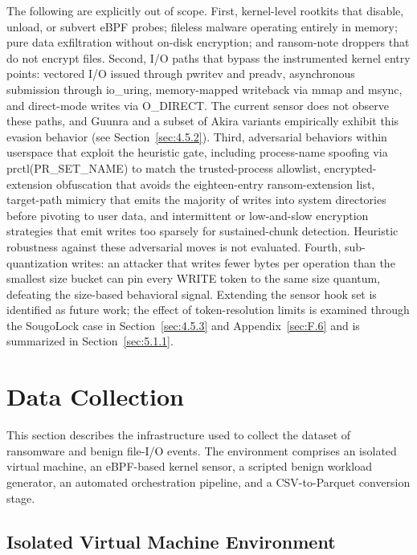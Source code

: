The following are explicitly out of scope. First, kernel-level rootkits that disable, unload, or subvert eBPF probes; fileless malware operating entirely in memory; pure data exfiltration without on-disk encryption; and ransom-note droppers that do not encrypt files. Second, I/\allowbreak{}O paths that bypass the instrumented kernel entry points: vectored I/\allowbreak{}O issued through pwritev and preadv, asynchronous submission through io\_\allowbreak{}uring, memory-mapped writeback via mmap and msync, and direct-mode writes via O\_\allowbreak{}DIRECT. The current sensor does not observe these paths, and Guunra and a subset of Akira variants empirically exhibit this evasion behavior (see Section~\ref{sec:4.5.2}). Third, adversarial behaviors within userspace that exploit the heuristic gate, including process-name spoofing via prctl(PR\_\allowbreak{}SET\_\allowbreak{}NAME) to match the trusted-process allowlist, encrypted-extension obfuscation that avoids the eighteen-entry ransom-extension list, target-path mimicry that emits the majority of writes into system directories before pivoting to user data, and intermittent or low-and-slow encryption strategies that emit writes too sparsely for sustained-chunk detection. Heuristic robustness against these adversarial moves is not evaluated. Fourth, sub-quantization writes: an attacker that writes fewer bytes per operation than the smallest size bucket can pin every WRITE token to the same size quantum, defeating the size-based behavioral signal. Extending the sensor hook set is identified as future work; the effect of token-resolution limits is examined through the SougoLock case in Section~\ref{sec:4.5.3} and Appendix~\ref{sec:F.6} and is summarized in Section~\ref{sec:5.1.1}.

\section{Data Collection}\label{sec:3.2}

This section describes the infrastructure used to collect the dataset of ransomware and benign file-I/\allowbreak{}O events. The environment comprises an isolated virtual machine, an eBPF-based kernel sensor, a scripted benign workload generator, an automated orchestration pipeline, and a CSV-to-Parquet conversion stage.

\subsection{Isolated Virtual Machine Environment}\label{sec:3.2.1}

